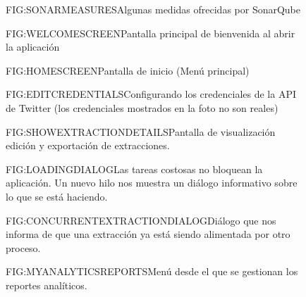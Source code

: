 \begin{figure}[Medidas con SonarQube]{FIG:SONARMEASURES}{Algunas medidas ofrecidas por SonarQube}
	 \quad
	 \quad
\end{figure}

\begin{figure}[Pantalla inicial]{FIG:WELCOMESCREEN}{Pantalla principal de bienvenida al abrir la aplicación}
\end{figure}
\begin{figure}[Pantalla de bienvenida]{FIG:HOMESCREEN}{Pantalla de inicio (Menú principal)}
\end{figure}

\begin{figure}[Edición de credenciales]{FIG:EDITCREDENTIALS}{Configurando los credenciales de la API de Twitter (los credenciales mostrados en la foto no son reales)}
\end{figure}

\begin{figure}[Editor de extracciones]{FIG:SHOWEXTRACTIONDETAILS}{Pantalla de visualización edición y exportación de extracciones.}
\end{figure}


\begin{figure}[Tarea en segundo plano]{FIG:LOADINGDIALOG}{Las tareas costosas no bloquean la aplicación. Un nuevo hilo nos muestra un diálogo informativo sobre lo que se está haciendo.}
\end{figure}


\begin{figure}[Aviso sobre extracción ya en curso]{FIG:CONCURRENTEXTRACTIONDIALOG}{Diálogo que nos informa de que una extracción ya está siendo alimentada por otro proceso.}
\end{figure}


\begin{figure}[Menú GUI de gestion de reportes analíticos]{FIG:MYANALYTICSREPORTS}{Menú desde el que se gestionan los reportes analíticos.}
\end{figure}

